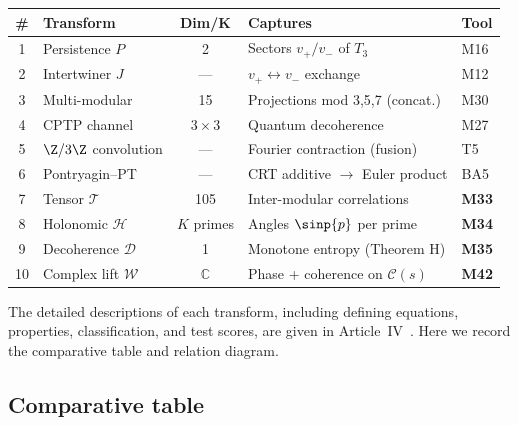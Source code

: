 \documentclass[12pt,a4paper]{article}
\begin{document}
\begin{center}
\small
\begin{tabular}{clcll}
\toprule
\textbf{\#} & \textbf{Transform} & \textbf{Dim/K} &
  \textbf{Captures} & \textbf{Tool} \\
\midrule
1 & Persistence $P$ & 2 &
  Sectors $v_+/v_-$ of $T_3$ & M16 \\
2 & Intertwiner $J$ & --- &
  $v_+ \leftrightarrow v_-$ exchange & M12 \\
3 & Multi-modular & 15 &
  Projections mod 3,5,7 (concat.) & M30 \\
4 & CPTP channel & $3\times 3$ &
  Quantum decoherence & M27 \\
5 & $\Z/3\Z$ convolution & --- &
  Fourier contraction (fusion) & T5 \\
6 & Pontryagin--PT & --- &
  CRT additive $\to$ Euler product & BA5 \\
7 & Tensor $\mathcal{T}$ & 105 &
  Inter-modular correlations & \textbf{M33} \\
8 & Holonomic $\mathcal{H}$ & $K$ primes &
  Angles $\sinp{p}$ per prime & \textbf{M34} \\
9 & Decoherence $\mathcal{D}$ & 1 &
  Monotone entropy (Theorem H) & \textbf{M35} \\
10 & Complex lift $\mathcal{W}$ & $\mathbb{C}$ &
  Phase + coherence on $\mathcal{C}(s)$ & \textbf{M42} \\
\bottomrule
\end{tabular}
\end{center}

The detailed descriptions of each transform, including defining
equations, properties, classification, and test scores, are given
in Article~IV~\cite{companion_M4}.  Here we record the comparative
table and relation diagram.

\subsection*{Comparative table}
\end{document}

